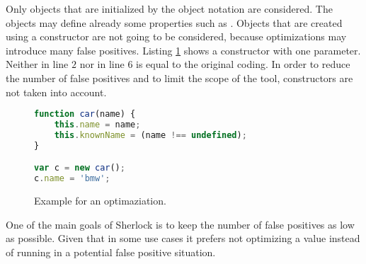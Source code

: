 Only objects that are initialized by the object notation \js{\{\}} are considered. The objects may define already some properties such as . Objects that are created using a constructor are not going to be considered, because optimizations may introduce many false positives. Listing \ref{list:example3} shows a constructor with one parameter. Neither  in line $2$ nor   in line $6$ is equal to the original coding. In order to reduce the number of false positives and to limit the scope of the tool, constructors are not taken into account.

\begin{figure}[htbp]
\begin{lstlisting}[language=Javascript]
function car(name) {
    this.name = name;
    this.knownName = (name !== undefined);
}

var c = new car();
c.name = 'bmw';
\end{lstlisting}
\caption{Example for an optimaziation.}\label{list:example3}
\end{figure}

One of the main goals of Sherlock is to keep the number of false positives as low as possible. Given that in some use cases it prefers not optimizing a value instead of running in a potential false positive situation.
